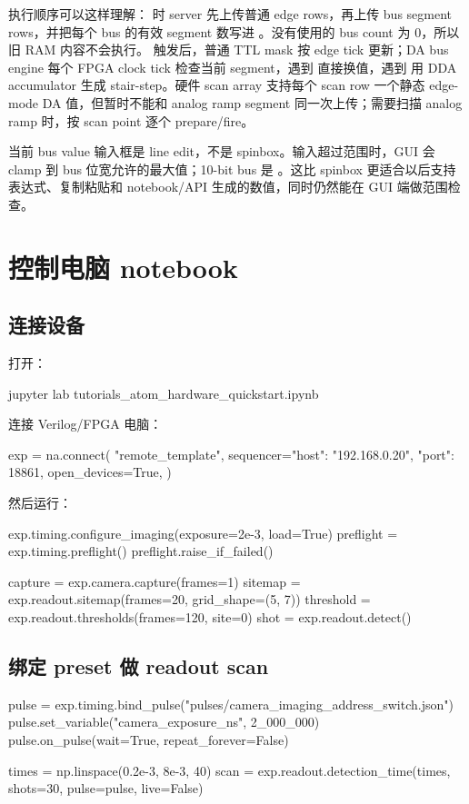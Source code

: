 \documentclass[11pt,oneside,openany]{book}
\begin{document}
执行顺序可以这样理解： 时 server 先上传普通 edge rows，再上传 bus segment rows，并把每个 bus 的有效 segment 数写进 。没有使用的 bus count 为 0，所以旧 RAM 内容不会执行。 触发后，普通 TTL mask 按 edge tick 更新；DA bus engine 每个 FPGA clock tick 检查当前 segment，遇到  直接换值，遇到  用 DDA accumulator 生成 stair-step。硬件 scan array 支持每个 scan row 一个静态 edge-mode DA 值，但暂时不能和 analog ramp segment 同一次上传；需要扫描 analog ramp 时，按 scan point 逐个 prepare/fire。

当前 bus value 输入框是 line edit，不是 spinbox。输入超过范围时，GUI 会 clamp 到 bus 位宽允许的最大值；10-bit bus 是 。这比 spinbox 更适合以后支持表达式、复制粘贴和 notebook/API 生成的数值，同时仍然能在 GUI 端做范围检查。

\chapter{控制电脑 notebook}
\section{连接设备}
打开：

\begin{codeblock}[PowerShell]
jupyter lab tutorials\neutral_atom_hardware_quickstart.ipynb
\end{codeblock}

连接 Verilog/FPGA 电脑：

\begin{codeblock}[Python]
exp = na.connect(
    "remote_template",
    sequencer={"host": "192.168.0.20", "port": 18861},
    open_devices=True,
)
\end{codeblock}

然后运行：

\begin{codeblock}[Python]
exp.timing.configure_imaging(exposure=2e-3, load=True)
preflight = exp.timing.preflight()
preflight.raise_if_failed()

capture = exp.camera.capture(frames=1)
sitemap = exp.readout.sitemap(frames=20, grid_shape=(5, 7))
threshold = exp.readout.thresholds(frames=120, site=0)
shot = exp.readout.detect()
\end{codeblock}

\section{绑定 preset 做 readout scan}
\begin{codeblock}[Python]
pulse = exp.timing.bind_pulse("pulses/camera_imaging_address_switch.json")
pulse.set_variable("camera_exposure_ns", 2_000_000)
pulse.on_pulse(wait=True, repeat_forever=False)

times = np.linspace(0.2e-3, 8e-3, 40)
scan = exp.readout.detection_time(times, shots=30, pulse=pulse, live=False)
\end{codeblock}
\end{document}
